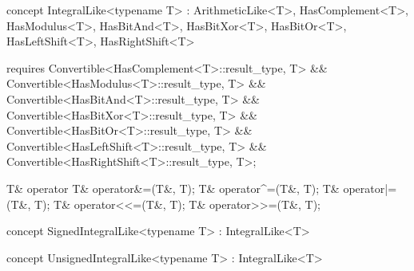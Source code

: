 \documentclass[american,twoside]{book}
\begin{document}
\begin{itemdecl}
concept IntegralLike<typename T> 
  : ArithmeticLike<T>, HasComplement<T>, HasModulus<T>, HasBitAnd<T>, HasBitXor<T>, HasBitOr<T>,
    HasLeftShift<T>, HasRightShift<T> {
  requires Convertible<HasComplement<T>::result_type, T>
        && Convertible<HasModulus<T>::result_type, T>
        && Convertible<HasBitAnd<T>::result_type, T>
        && Convertible<HasBitXor<T>::result_type, T>
        && Convertible<HasBitOr<T>::result_type, T>
        && Convertible<HasLeftShift<T>::result_type, T>
        && Convertible<HasRightShift<T>::result_type, T>;

  T& operator%
  T& operator&=(T&, T);
  T& operator^=(T&, T);
  T& operator|=(T&, T);
  T& operator<<=(T&, T);
  T& operator>>=(T&, T);
}
\end{itemdecl}

\begin{itemdescr}
\pnum 
{}
\end{itemdescr}

\begin{itemdecl}
concept SignedIntegralLike<typename T> : IntegralLike<T> { }
\end{itemdecl}

\begin{itemdescr}
\pnum
{}

\pnum
{}
\end{itemdescr}

\begin{itemdecl}
concept UnsignedIntegralLike<typename T> : IntegralLike<T> { }
\end{itemdecl}

\begin{itemdescr}
\pnum
{}

\pnum
{}
\end{itemdescr}
\end{document}

